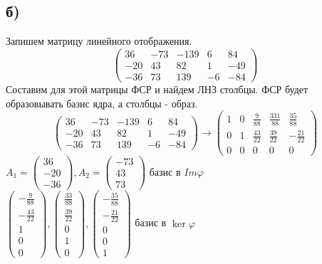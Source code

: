 	\subsection*{б)}
	Запишем матрицу линейного отображения.  
	$$\begin{pmatrix}
		36 & -73 & -139 & 6 & 84 \\
		-20 & 43 & 82 & 1 & -49 \\
		-36 & 73 & 139 & -6 & -84
	\end{pmatrix}$$
Составим для этой матрицы ФСР и найдем ЛНЗ столбцы. ФСР будет образовывать базис ядра, а столбцы - образ. 
	$$\begin{pmatrix}
	36 & -73 & -139 & 6 & 84 \\
	-20 & 43 & 82 & 1 & -49 \\
	-36 & 73 & 139 & -6 & -84
\end{pmatrix}\to \begin{pmatrix}
1 & 0 & \frac{9}{88} & \frac{331}{88} & \frac{35}{88} \\
0 & 1 & \frac{43}{22} & \frac{39}{22} & -\frac{21}{22} \\
0 & 0 & 0 & 0 & 0
\end{pmatrix}$$
$A_1 = \begin{pmatrix}
	36 \\
	-20 \\
	-36 
\end{pmatrix} ,A_2 = \begin{pmatrix}
-73 \\
43\\
73 
\end{pmatrix} $ базис в $Im\varphi$ \\
$\begin{pmatrix}
	-\frac{9}{88} \\
	-\frac{43}{22} \\
	1 \\
	0 \\
	0
\end{pmatrix},
\begin{pmatrix}
	\frac{33}{88} \\
	\frac{39}{22} \\
	0 \\
	1 \\
	0
\end{pmatrix} ,
\begin{pmatrix}
	-\frac{35}{88} \\
	-\frac{21}{22} \\
	0 \\
	0 \\
	1
\end{pmatrix}$ базис в $\ker\varphi$
